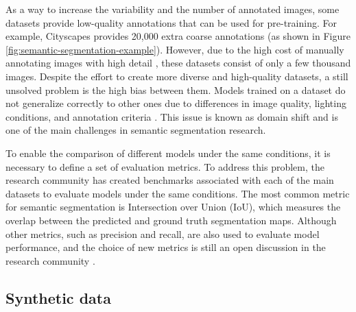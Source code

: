 As a way to increase the variability and the number of annotated images, some datasets provide low-quality annotations that can be used for pre-training. For example, Cityscapes provides 20,000 extra coarse annotations (as shown in Figure \ref{fig:semantic-segmentation-example}). However, due to the high cost of manually annotating images with high detail \cite{Lin_2019_ICCV}, these datasets consist of only a few thousand images. Despite the effort to create more diverse and high-quality datasets, a still unsolved problem is the high bias between them. Models trained on a dataset do not generalize correctly to other ones due to differences in image quality, lighting conditions, and annotation criteria \cite{mapilliary}. This issue is known as domain shift and is one of the main challenges in semantic segmentation research.

To enable the comparison of different models under the same conditions, it is necessary to define a set of evaluation metrics. To address this problem, the research community has created benchmarks associated with each of the main datasets to evaluate models under the same conditions. The most common metric for semantic segmentation is Intersection over Union (IoU), which measures the overlap between the predicted and ground truth segmentation maps. Although other metrics, such as precision and recall, are also used to evaluate model performance, and the choice of new metrics is still an open discussion in the research community \cite{metrics1, Zhang2021RethinkingSS, Cho2021WeightedIO}.




\subsection{Synthetic data}






